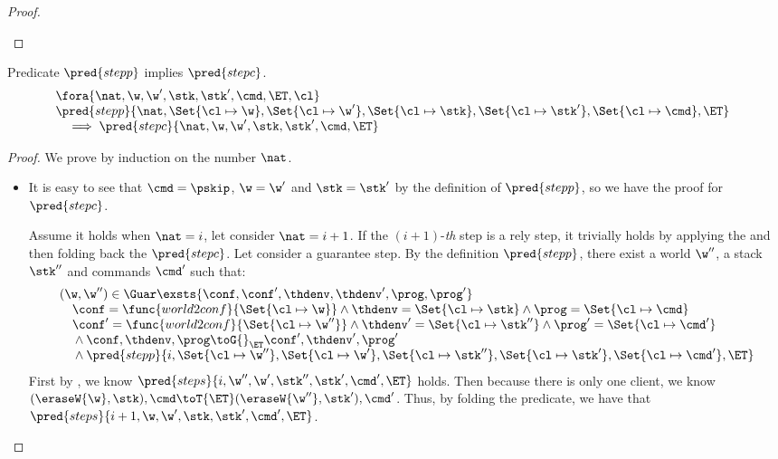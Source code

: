 \begin{proof}
\begin{itemize}
\begin{itemize}
\begin{itemize}
    \end{itemize}
\end{itemize}
\end{itemize}
\end{proof}


\begin{lemma}
\label{lem:prgram-step-to-command-step}
Predicate \( \pred{stepp} \) implies  \( \pred{stepc} \).
\[
\begin{array}{@{}l}
    \fora{\nat, \w, \w', \stk, \stk', \cmd, \ET, \cl} \\
    \pred{stepp}{\nat, \Set{\cl \mapsto \w},\Set{\cl \mapsto \w'}, \Set{\cl \mapsto \stk}, \Set{ \cl \mapsto \stk'}, \Set{\cl \mapsto \cmd}, \ET}  \\ 
    \quad \implies \pred{stepc}{\nat, \w, \w', \stk, \stk', \cmd, \ET} \\
\end{array}
\]
\end{lemma}
\begin{proof}
We prove by induction on the number \( \nat \).

\begin{itemize}

\item {}
It is easy to see that \( \cmd = \pskip \), \( \w = \w'\) and \( \stk = \stk' \) by the definition of \(  \pred{stepp}\), so we have the proof for \( \pred{stepc} \).

Assume it holds when \( \nat = i \), let consider \( \nat = i + 1 \).
If the \((i + 1)\)-\emph{th} step is a rely step, it trivially holds by applying the \ih and then folding back the \( \pred{stepc} \).
Let consider a guarantee step.
By the definition \( \pred{stepp}\), there exist a world \( \w'' \), a stack \( \stk'' \) and commands \( \cmd' \) such that:
\[
\begin{array}{@{}l@{}}
    (\w, \w'') \in \Guar  
    \exsts{\conf, \conf', \thdenv, \thdenv', \prog, \prog'} \\
    \quad \conf = \func{world2conf}{\Set{\cl \mapsto \w}}
    \land \thdenv =  \Set{\cl \mapsto \stk} 
    \land \prog = \Set{\cl \mapsto \cmd} \\
    \quad {} \conf' = \func{world2conf}{\Set{\cl \mapsto \w''}}
    \land \thdenv' =  \Set{\cl \mapsto \stk''} 
    \land \prog' = \Set{\cl \mapsto \cmd'} \\
    \quad {} \land  \conf, \thdenv , \prog \toG{}_{\ET} \conf', \thdenv' , \prog'   \\
    \quad {} \land \pred{stepp}{ i, \Set{\cl \mapsto \w''},\Set{\cl \mapsto \w'}, \Set{\cl \mapsto \stk''}, \Set{ \cl \mapsto \stk'}, \Set{\cl \mapsto \cmd'}, \ET}
\end{array}
\]
First by \ih, we know  \( \pred{steps}{ i, \w'', \w', \stk'', \stk', \cmd', \ET} \) holds.
Then because there is only one client, we know \( (\eraseW{\w}, \stk ), \cmd \toT{\ET} (\eraseW{\w''}, \stk'), \cmd' \).
Thus, by folding the predicate, we have that \( \pred{steps}{ i + 1, \w, \w', \stk, \stk', \cmd', \ET} \).
\end{itemize}
\end{proof}
